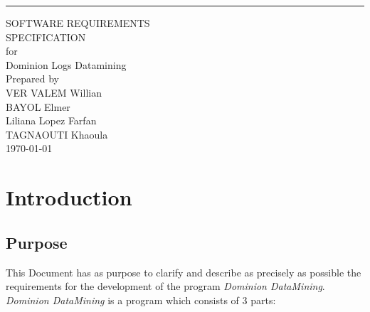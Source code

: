 \documentclass{scrreprt}
\date{}
\begin{document}
\begin{flushright}
    \rule{16cm}{5pt}\vskip1cm
    \begin{bfseries}
        \Huge{SOFTWARE REQUIREMENTS\\ SPECIFICATION}\\
        \vspace{1.9cm}
        for\\
        \vspace{1.9cm}
        Dominion Logs Datamining\\
        \vspace{1.9cm}
        Prepared by \\ VER VALEM Willian \\ BAYOL Elmer \\ Liliana Lopez Farfan
        \\ TAGNAOUTI Khaoula\\
        \vspace{1.9cm}
        \today\\
    \end{bfseries}
\end{flushright}

\tableofcontents




\chapter{Introduction}

\section{Purpose}
This Document has as purpose to clarify and describe as precisely as possible the
requirements for the development of the program \textit{Dominion DataMining}.\\
\textit{Dominion DataMining} is a program which consists of 3 parts:
\end{document}
